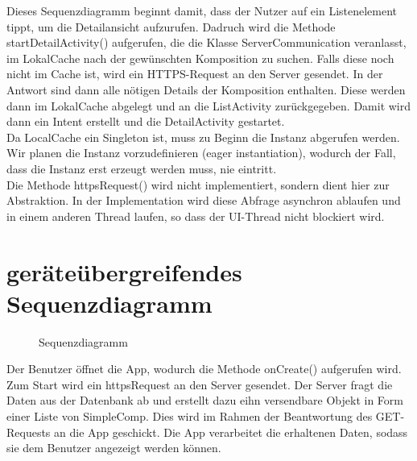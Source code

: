 Dieses Sequenzdiagramm beginnt damit, dass der Nutzer auf ein Listenelement tippt, um die Detailansicht aufzurufen. 
Dadruch wird die Methode startDetailActivity() aufgerufen, die die Klasse ServerCommunication veranlasst, im LokalCache nach der gewünschten Komposition zu suchen.
Falls diese noch nicht im Cache ist, wird ein HTTPS-Request an den Server gesendet.
In der Antwort sind dann alle nötigen Details der Komposition enthalten.
Diese werden dann im LokalCache abgelegt und an die ListActivity zurückgegeben.
Damit wird dann ein Intent erstellt und die DetailActivity gestartet.
\\
Da LocalCache ein Singleton ist, muss zu Beginn die Instanz abgerufen werden. Wir planen die Instanz vorzudefinieren (eager instantiation), wodurch der Fall, dass die Instanz erst erzeugt werden muss, nie eintritt.
\\
Die Methode httpsRequest() wird nicht implementiert, sondern dient hier zur Abstraktion. In der Implementation wird diese Abfrage asynchron ablaufen und in einem anderen Thread laufen, so dass der UI-Thread nicht blockiert wird. 

\section*{geräteübergreifendes Sequenzdiagramm}

\begin{figure}[h]
	\centering
	\caption{Sequenzdiagramm}
	\label{fig:sequenz-a}
\end{figure}

Der Benutzer öffnet die App, wodurch die Methode onCreate() aufgerufen wird. Zum Start wird ein httpsRequest an den Server gesendet. Der Server fragt die Daten aus der Datenbank ab und erstellt dazu eihn versendbare Objekt in Form einer Liste von SimpleComp. Dies wird im Rahmen der Beantwortung des GET-Requests an die App geschickt. Die App verarbeitet die erhaltenen Daten, sodass sie dem Benutzer angezeigt werden können.